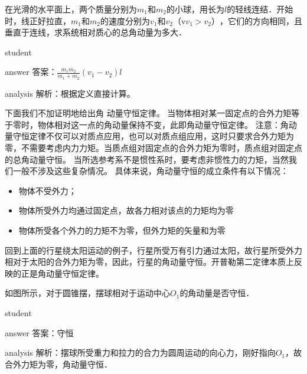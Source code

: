 \begin{example}
	在光滑的水平面上，两个质量分别为$ m_1 $和$ m_2 $的小球，用长为$ l $的轻线连结．开始时，线正好拉直，$ m_1 $和$ m_2 $的速度分别为$ v_1 $和$ v_2 $（v$v_1>v_2） $，它们的方向相同，且垂直于连线，求系统相对质心的总角动量为多大．
	
	\begin{taggedblock}{student}
		\vspace*{1cm}
	\end{taggedblock}
	
	
	\begin{taggedblock}{answer}
		答案：$ \frac{m_1m_2}{m_1+m_2}(v_1-v_2)l $
	\end{taggedblock}
	
	
	\begin{taggedblock}{analysis}
		解析：根据定义直接计算。
	\end{taggedblock}
\end{example}


下面我们不加证明地给出角 动量守恒定律。
当物体相对某一固定点的合外力矩等于零时，物体相对这一点的角动量保持不变，此即角动量守恒定律。
注意：角动量守恒定律不仅可以对质点应用，也可以对质点组应用，这时只要求合外力矩为零，不需要考虑内力力矩。当质点组对固定点的合外力矩为零时，质点组对固定点的总角动量守恒。
当所选参考系不是惯性系时，要考虑非惯性力的力矩，当然我们一般不涉及这些复杂情况。
具体来说，角动量守恒的成立条件有以下情况：

\begin{itemize}
	\item 物体不受外力；
	
	\item 物体所受外力均通过固定点，故各力相对该点的力矩均为零
	
	\item 物体所受各个外力的力矩不为零，但外力矩的矢量和为零
\end{itemize}

回到上面的行星绕太阳运动的例子，行星所受万有引力通过太阳，故行星所受外力相对于太阳的合外力矩为零，因此，行星的角动量守恒。开普勒第二定律本质上反映的正是角动量守恒定律。

\begin{example}
	如图所示，对于圆锥摆，摆球相对于运动中心$ O_1 $的角动量是否守恒．
	
	\begin{taggedblock}{student}
		\vspace*{1cm}
	\end{taggedblock}
	
	
	\begin{taggedblock}{answer}
		答案：守恒
	\end{taggedblock}
	
	
	\begin{taggedblock}{analysis}
		解析：摆球所受重力和拉力的合力为圆周运动的向心力，刚好指向$ O_1 $，故合外力矩为零，角动量守恒．
	\end{taggedblock}
\end{example}


